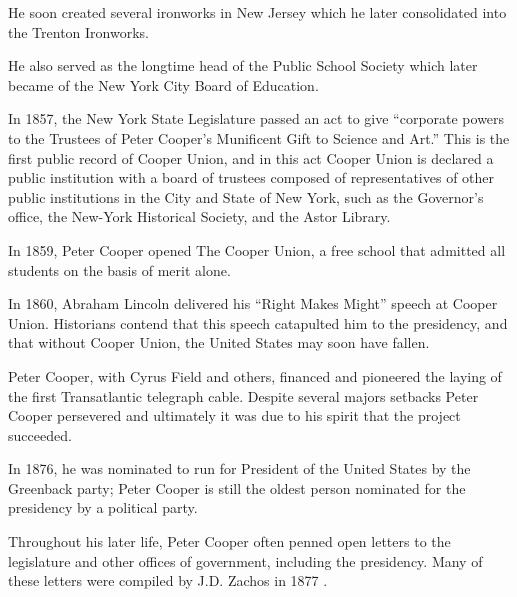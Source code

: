 \documentclass{article}
\begin{document}
\begin{minipage}[t]{0.46\linewidth}
\fontsize{11pt}{13pt}\selectfont
\raggedright
\upshape
\begin{enumList}
\setcounter{enumListi}{\value{enumTemp}}

\item He soon created several ironworks in New Jersey which he later
consolidated into the {\mdseries Trenton Ironworks}.

\item He also served as the longtime {\mdseries head of the Public School
Society} which later became of the New York City Board of Education.

\item In 1857, the New York State Legislature passed an act to give ``corporate
powers to the Trustees of Peter Cooper's Munificent Gift to Science and Art.''
This is the first public record of Cooper Union, and in this act Cooper Union
is declared a {\mdseries public institution with a board of trustees composed
of representatives of other public institutions in the City and State of New
York}, such as the Governor's office, the New-York Historical Society, and the
Astor Library.

\item In 1859, Peter Cooper opened The Cooper Union, a {\mdseries free school
that admitted all students on the basis of merit alone.}

\item In 1860, {\mdseries Abraham Lincoln} delivered his {\mdseries ``Right
Makes Might''} speech at Cooper Union. Historians contend that this speech
catapulted him to the presidency, and that {\mdseries without Cooper Union,
the United States may soon have fallen.}

\item Peter Cooper, with Cyrus Field and others, financed and pioneered the
laying of the {\mdseries first Transatlantic telegraph cable}. Despite several
majors setbacks Peter Cooper persevered and ultimately it was due to his
spirit that the project succeeded.

\item In 1876, he was {\mdseries nominated to run for President of the United
States} by the Greenback party; Peter Cooper is still the {\mdseries oldest
person} nominated for the presidency by a political party.

\item Throughout his later life, Peter Cooper often penned open letters to the
legislature and other offices of government, including the presidency. Many of
these letters were compiled by J.D. Zachos in 1877 \cite{opinions}.


\end{enumList}
\end{minipage}
\end{document}
